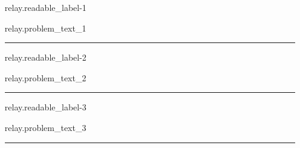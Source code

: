 \documentclass{article}
\begin{document}
\begin{itemize}
\item[{{relay.readable_label}}-1] \begin{minipage}[t]{\linewidth}
{{relay.problem_text_1}} 

\end{minipage}

  \rule{\textwidth}{.5pt}
  

\item[{{relay.readable_label}}-2] \begin{minipage}[t]{\linewidth}
{{relay.problem_text_2}} 

\end{minipage}

  \rule{\textwidth}{.5pt}
  


\item[{{relay.readable_label}}-3] \begin{minipage}[t]{\linewidth}
{{relay.problem_text_3}} 

\end{minipage}

  \rule{\textwidth}{.5pt}
  

  
\end{itemize}
\end{document}
